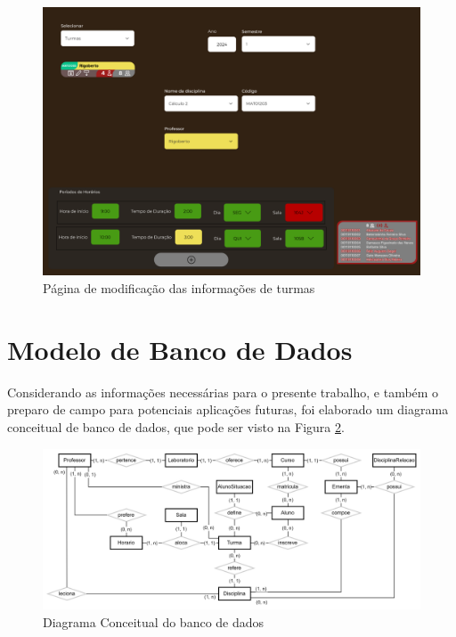    \begin{figure}[htbp]\centering
        \caption{\label{fig:CRUD_turmas} Página de modificação das informações de turmas}
        \includegraphics[scale=0.6]{files/img/Prototipo/Medio/CRUD_turmas.png}
    \end{figure} %

\section{Modelo de Banco de Dados} %

    Considerando as informações necessárias para o presente trabalho, e também o preparo de campo para potenciais aplicações futuras, foi elaborado um diagrama conceitual de banco de dados, que pode ser visto na Figura \ref{fig:DiagramConceitual}.

    \begin{figure}[htbp]\centering
        \caption{\label{fig:DiagramConceitual} Diagrama Conceitual do banco de dados}
        \includegraphics[scale=0.2]{files/img/DiagramaConceitual/DiagramaConceitualBranco.png}
    \end{figure} %

